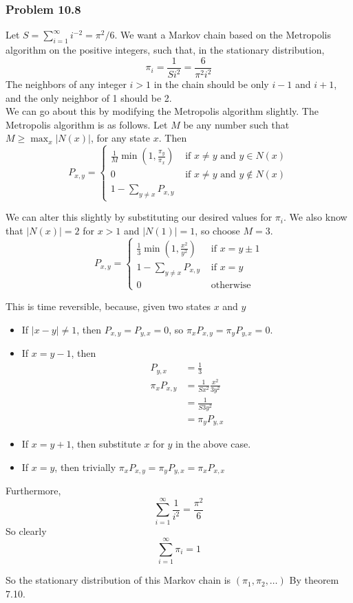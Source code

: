 \documentclass[12pt,letterpaper]{article}
\newenvironment{answer}[1]{
  \subsubsection*{Problem #1}
}{\newpage}
\begin{document}
\begin{answer}{10.8}
Let $S = \sum_{i=1}^\infty i^{-2} = \pi^2 / 6$. We want a Markov chain based on the Metropolis algorithm on the positive integers, such that, in the stationary distribution,
	$$ \pi_i = \frac{1}{S i^2} = \frac{6}{\pi^2 i^2}$$
The neighbors of any integer $i > 1$ in the chain should be only $i-1$ and $i+1$, and the only neighbor of 1 should be 2. \\

We can go about this by modifying the Metropolis algorithm slightly. The Metropolis algorithm is as follows. Let $M$ be any number such that $M \ge \max_{x} |N(x)|$, for any state $x$. Then
	$$
	P_{x,y} = \begin{cases}
		\frac{1}{M} \min(1,\frac{\pi_y}{\pi_x}) &\mbox{ if } x \ne y \text{ and } y \in N(x)\\
		0 &\mbox{ if } x \ne y \text{ and } y \notin N(x) \\
		1 - \sum_{y \ne x} P_{x,y}
	\end{cases}
	$$

We can alter this slightly by substituting our desired values for $\pi_i$. We also know that $|N(x)| = 2$ for $x > 1$ and $|N(1)| = 1$, so choose $M = 3$.
	$$
	P_{x,y} = \begin{cases}
		\frac{1}{3} \min(1,\frac{ x^2 }{ y^2 }) &\mbox{ if } x = y \pm 1 \\
		1 - \sum_{y \ne x} P_{x,y} &\mbox{ if } x = y\\
		0 &\mbox{ otherwise }
	\end{cases}
	$$

	This is time reversible, because, given two states $x$ and $y$
	\begin{itemize}
	\item If $|x - y| \ne 1$, then $P_{x,y} = P_{y,x} = 0$, so $\pi_x P_{x,y} = \pi_y P_{y,x} = 0$.

	\item If $x = y - 1$, then
		\begin{align*}
			P_{y,x} &= \frac{1}{3} \\
			\pi_x P_{x,y} &= \frac{1}{S x^2} \frac{x^2}{3 y^2}\\
				&= \frac{1}{S 3 y^2} \\
				&=  \pi_y P_{y,x}
		\end{align*}

	\item If $x = y + 1$, then substitute $x$ for $y$ in the above case.

	\item If $x = y$, then trivially $\pi_x P_{x,y} = \pi_y P_{y,x} = \pi_x P_{x,x}$
	\end{itemize}
	Furthermore,
		$$\sum_{i=1}^\infty \frac{1}{i^2} = \frac{\pi^2}{6}$$
	So clearly
		$$\sum_{i=1}^\infty \pi_i = 1 $$

	So the stationary distribution of this Markov chain is $(\pi_1, \pi_2, \ldots)$ By theorem 7.10.
	\end{answer}
\end{document}
